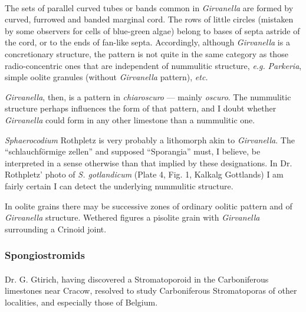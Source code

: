 \documentclass[a4paper, 12pt, oneside]{article}
\begin{document}
\paragraph{}
The sets of parallel curved tubes or bands common in \emph{Girvanella} are formed by curved, furrowed and banded marginal cord. The rows of little circles (mistaken by some observers for cells of blue-green algae) belong to bases of septa astride of the cord, or to the ends of fan-like septa. Accordingly, although \emph{Girvanella} is a concretionary structure, the pattern is not quite in the same category as those radio-concentric ones that are independent of nummulitic structure, \emph{e.g.} \emph{Parkeria}, simple oolite granules (without \emph{Girvanella} pattern), \emph{etc.}

\emph{Girvanella}, then, is a pattern in \emph{chiaroscuro} --- mainly \emph{oscuro}. The nummulitic structure perhaps influences the form of that pattern, and I doubt whether \emph{Girvanella} could form in any other limestone than a nummulitic one.

\emph{Sphaerocodium} Rothpletz is very probably a lithomorph akin to \emph{Girvanella}. The ``schlauchförmige zellen'' and supposed ``Sporangia'' must, I believe, be interpreted in a sense otherwise than that implied by these designations. In Dr. Rothpletz' photo of \emph{S. gotlandicum} (Plate 4, Fig. 1, Kalkalg Gottlands) I am fairly certain I can detect the underlying nummulitic structure.

In oolite grains there may be successive zones of ordinary oolitic pattern and of \emph{Girvanella} structure. Wethered figures a pisolite grain with \emph{Girvanella} surrounding a Crinoid joint.

\subsubsection{Spongiostromids}
\paragraph{}
Dr. G. Gtirich, having discovered a Stromatoporoid in the Carboniferous limestones near Cracow, resolved to study Carboniferous Stromatoporas of other localities, and especially those of Belgium.
\end{document}
